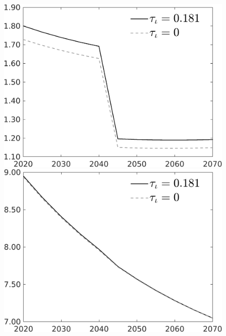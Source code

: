 \documentclass[12pt]{article}
\begin{document}
\begin{figure}[h!!]
\begin{minipage}[]{0.32\textwidth}
\end{minipage}	
\begin{minipage}[]{0.32\textwidth}
\includegraphics[width=1\textwidth]{../../codding_model/own_basedOnFried/optimalPol_010922_revision/figures/all_13Sept22/CompTauf_bytaul_Reg0_gAf_spillover0_nsk0_xgr0_knspil0_sep1_LFlimit1_emsbase0_countec0_GovRev0_etaa0.79_lgd1.png}
\end{minipage}	
\begin{minipage}[]{0.32\textwidth}
\includegraphics[width=1\textwidth]{../../codding_model/own_basedOnFried/optimalPol_010922_revision/figures/all_13Sept22/CompTauf_bytaul_Reg0_gAn_spillover0_nsk0_xgr0_knspil0_sep1_LFlimit1_emsbase0_countec0_GovRev0_etaa0.79_lgd1.png}

\end{minipage}
\end{figure}
\end{document}

